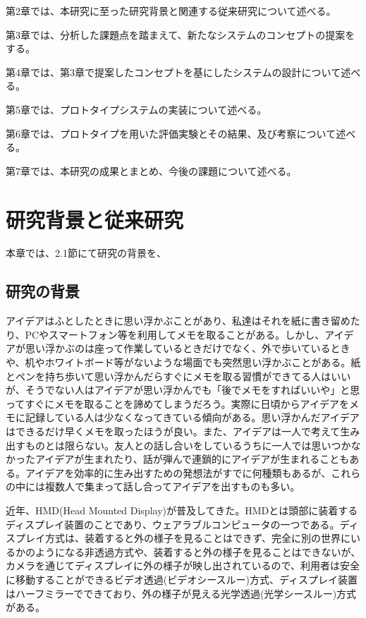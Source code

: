 \documentclass[11pt,a4j, titlepage]{jarticle} %
\begin{document}
第2章では、本研究に至った研究背景と関連する従来研究について述べる。

第3章では、分析した課題点を踏まえて、新たなシステムのコンセプトの提案をする。

第4章では、第3章で提案したコンセプトを基にしたシステムの設計について述べる。

第5章では、プロトタイプシステムの実装について述べる。

第6章では、プロトタイプを用いた評価実験とその結果、及び考察について述べる。

第7章では、本研究の成果とまとめ、今後の課題について述べる。

\newpage
\section{研究背景と従来研究}
本章では、2.1節にて研究の背景を、

\subsection{研究の背景}
アイデアはふとしたときに思い浮かぶことがあり、私達はそれを紙に書き留めたり、PCやスマートフォン等を利用してメモを取ることがある。しかし、アイデアが思い浮かぶのは座って作業しているときだけでなく、外で歩いているときや、机やホワイトボード等がないような場面でも突然思い浮かぶことがある。紙とペンを持ち歩いて思い浮かんだらすぐにメモを取る習慣ができてる人はいいが、そうでない人はアイデアが思い浮かんでも「後でメモをすればいいや」と思ってすぐにメモを取ることを諦めてしまうだろう。実際に日頃からアイデアをメモに記録している人は少なくなってきている傾向がある\cite{memo}。思い浮かんだアイデアはできるだけ早くメモを取ったほうが良い。また、アイデアは一人で考えて生み出すものとは限らない。友人との話し合いをしているうちに一人では思いつかなかったアイデアが生まれたり、話が弾んで連鎖的にアイデアが生まれることもある。アイデアを効率的に生み出すための発想法がすでに何種類もあるが、これらの中には複数人で集まって話し合ってアイデアを出すものも多い\cite{hassouhou}。

近年、HMD(Head Mounted Display)が普及してきた。HMDとは頭部に装着するディスプレイ装置のことであり、ウェアラブルコンピュータの一つである。ディスプレイ方式は、装着すると外の様子を見ることはできず、完全に別の世界にいるかのようになる非透過方式や、装着すると外の様子を見ることはできないが、カメラを通じてディスプレイに外の様子が映し出されているので、利用者は安全に移動することができるビデオ透過(ビデオシースルー)方式、ディスプレイ装置はハーフミラーでできており、外の様子が見える光学透過(光学シースルー)方式がある。
\end{document}
